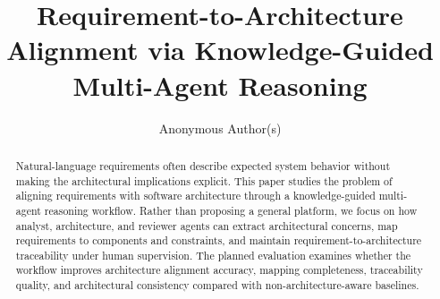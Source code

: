\documentclass[sigconf,anonymous,review]{acmart}
\title{Requirement-to-Architecture Alignment via Knowledge-Guided Multi-Agent Reasoning}
\author{Anonymous Author(s)}
\affiliation{
  \institution{Anonymous Institution}
  \country{Anonymous Country}
}
\begin{document}
\begin{abstract}
Natural-language requirements often describe expected system behavior without making the architectural implications explicit.
This paper studies the problem of aligning requirements with software architecture through a knowledge-guided multi-agent reasoning workflow.
Rather than proposing a general platform, we focus on how analyst, architecture, and reviewer agents can extract architectural concerns, map requirements to components and constraints, and maintain requirement-to-architecture traceability under human supervision.
The planned evaluation examines whether the workflow improves architecture alignment accuracy, mapping completeness, traceability quality, and architectural consistency compared with non-architecture-aware baselines.
\end{abstract}



\maketitle



















\appendix



\end{document}
